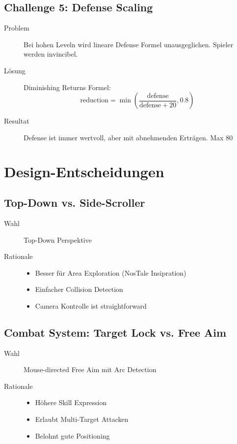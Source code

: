 \documentclass[
  a4paper,
  11pt,
  ngerman,
  parskip=half,
  bibliography=totoc,
  listof=totoc
]{scrreprt}
\begin{document}
\subsection{Challenge 5: Defense Scaling}

\begin{description}
    \item[Problem] Bei hohen Leveln wird lineare Defense Formel unausgeglichen. Spieler werden invincibel.
    \item[Lösung] Diminishing Returns Formel:
    \begin{equation}
        \text{reduction} = \min\left(\frac{\text{defense}}{\text{defense} + 20}, 0.8\right)
    \end{equation}
    \item[Resultat] Defense ist immer wertvoll, aber mit abnehmenden Erträgen. Max 80%
\end{description}

\section{Design-Entscheidungen}

\subsection{Top-Down vs. Side-Scroller}

\begin{description}
    \item[Wahl] Top-Down Perspektive
    \item[Rationale]
    \begin{itemize}
        \item Besser für Area Exploration (NosTale Insipration)
        \item Einfacher Collision Detection
        \item Camera Kontrolle ist straightforward
    \end{itemize}
\end{description}

\subsection{Combat System: Target Lock vs. Free Aim}

\begin{description}
    \item[Wahl] Mouse-directed Free Aim mit Arc Detection
    \item[Rationale]
    \begin{itemize}
        \item Höhere Skill Expression
        \item Erlaubt Multi-Target Attacken
        \item Belohnt gute Positioning
    \end{itemize}
\end{description}
\end{document}

